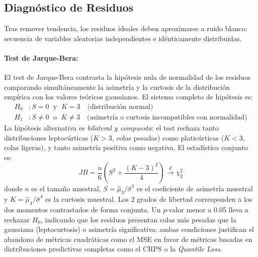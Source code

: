 \subsection{Diagnóstico de Residuos}
\label{subsec:eda_diagnostico_residuos}

Tras remover tendencia, los residuos ideales deben aproximarse a ruido blanco: secuencia de variables aleatorias independientes e idénticamente distribuidas.

\paragraph{Test de Jarque-Bera:}
El test de Jarque-Bera \parencite{JarqueBera1987} contrasta la hipótesis nula de normalidad
de los residuos comparando simultáneamente la asimetría y la curtosis de la distribución
empírica con los valores teóricos gaussianos. El sistema completo de hipótesis es:
\begin{align}
H_0 &: S = 0 \;\text{ y }\; K = 3 \quad \text{(distribución normal)}\\
H_1 &: S \neq 0 \;\text{ o }\; K \neq 3 \quad \text{(asimetría o curtosis incompatibles con normalidad)}
\end{align}
La hipótesis alternativa es \textit{bilateral y compuesta}: el test rechaza tanto distribuciones
leptocúrticas ($K > 3$, colas pesadas) como platicúrticas ($K < 3$, colas ligeras), y tanto
asimetría positiva como negativa. El estadístico conjunto es:
\begin{equation}
JB = \frac{n}{6} \left( S^2 + \frac{(K-3)^2}{4} \right) \xrightarrow{d} \chi^2_2
\label{eq:jarque_bera}
\end{equation}
donde $n$ es el tamaño muestral, $S = \hat{\mu}_3 / \hat{\sigma}^3$ es el coeficiente de
asimetría muestral y $K = \hat{\mu}_4 / \hat{\sigma}^4$ es la curtosis muestral. Los 2 grados
de libertad corresponden a los dos momentos contrastados de forma conjunta. Un $p$-valor menor
a 0.05 lleva a rechazar $H_0$, indicando que los residuos presentan colas más pesadas que la
gaussiana (leptocurtosis) o asimetría significativa; ambas condiciones justifican el abandono
de métricas cuadráticas como el MSE en favor de métricas basadas en distribuciones predictivas
completas como el CRPS o la \textit{Quantile Loss}.


